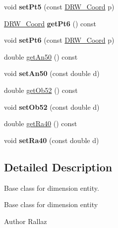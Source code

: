 \begin{DoxyCompactItemize}
\item 
\hypertarget{classDRW__Dimension_a167b92d96644fe59b8014b2591c6717e}{void {\bfseries set\-Pt5} (const \hyperlink{classDRW__Coord}{D\-R\-W\-\_\-\-Coord} p)}\label{classDRW__Dimension_a167b92d96644fe59b8014b2591c6717e}

\item 
\hypertarget{classDRW__Dimension_aa8a46b987af18ba2a4368b32b846d9cf}{\hyperlink{classDRW__Coord}{D\-R\-W\-\_\-\-Coord} {\bfseries get\-Pt6} () const }\label{classDRW__Dimension_aa8a46b987af18ba2a4368b32b846d9cf}

\item 
\hypertarget{classDRW__Dimension_a649bfc57ede8413888a56c1d7f6b284c}{void {\bfseries set\-Pt6} (const \hyperlink{classDRW__Coord}{D\-R\-W\-\_\-\-Coord} p)}\label{classDRW__Dimension_a649bfc57ede8413888a56c1d7f6b284c}

\item 
double \hyperlink{classDRW__Dimension_ae45501f2cad8bdcd9be874ff4f05749b}{get\-An50} () const 
\item 
\hypertarget{classDRW__Dimension_a61d400d9287138a5eccab60be331d92b}{void {\bfseries set\-An50} (const double d)}\label{classDRW__Dimension_a61d400d9287138a5eccab60be331d92b}

\item 
double \hyperlink{classDRW__Dimension_a36825b8bb477ec416d20a68d3cc5d54e}{get\-Ob52} () const 
\item 
\hypertarget{classDRW__Dimension_adc00e3257f59f222e2f725908b197d37}{void {\bfseries set\-Ob52} (const double d)}\label{classDRW__Dimension_adc00e3257f59f222e2f725908b197d37}

\item 
double \hyperlink{classDRW__Dimension_a6d8226ab5f019e2cd2f9a46c4fa7cade}{get\-Ra40} () const 
\item 
\hypertarget{classDRW__Dimension_afe0de16e5f1bda47b132e145d4cd2a3e}{void {\bfseries set\-Ra40} (const double d)}\label{classDRW__Dimension_afe0de16e5f1bda47b132e145d4cd2a3e}

\end{DoxyCompactItemize}


\subsection{Detailed Description}
Base class for dimension entity. 

Base class for dimension entity \begin{DoxyAuthor}{Author}
Rallaz 
\end{DoxyAuthor}


